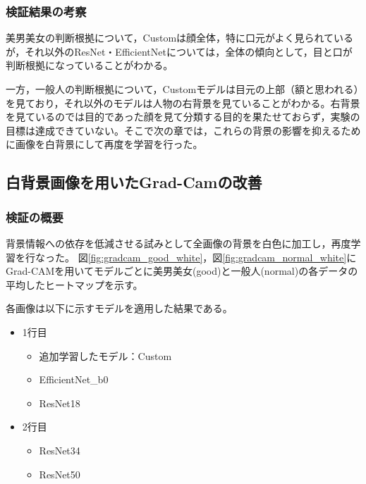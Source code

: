 \documentclass[a4paper,11pt,titlepage]{jsarticle}
\begin{document}
\subsubsection{検証結果の考察}
美男美女の判断根拠について，Customは顔全体，特に口元がよく見られているが，それ以外のResNet・EfficientNetについては，全体の傾向として，目と口が判断根拠になっていることがわかる。\par
一方，一般人の判断根拠について，Customモデルは目元の上部（額と思われる）を見ており，それ以外のモデルは人物の右背景を見ていることがわかる。右背景を見ているのでは目的であった顔を見て分類する目的を果たせておらず，実験の目標は達成できていない。そこで次の章では，これらの背景の影響を抑えるために画像を白背景にして再度を学習を行った。




\subsection{白背景画像を用いたGrad-Camの改善}
\subsubsection{検証の概要}

背景情報への依存を低減させる試みとして全画像の背景を白色に加工し，再度学習を行なった。
図\ref{fig:gradcam_good_white}，図\ref{fig:gradcam_normal_white}にGrad-CAMを用いてモデルごとに美男美女(good)と一般人(normal)の各データの平均したヒートマップを示す。

各画像は以下に示すモデルを適用した結果である。
\begin{itemize}
	\item 1行目
	\begin{itemize}
	\item 追加学習したモデル：Custom
	\item EfficientNet\_b0
	\item ResNet18
	\end{itemize}
	\item 2行目
	\begin{itemize}
	\item ResNet34
	\item ResNet50
	\end{itemize}
\end{itemize}
\end{document}
